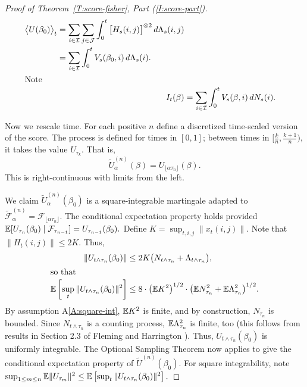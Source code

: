 \documentclass[aoas,preprint]{imsart}
\begin{document}
\begin{proof}[Proof of Theorem~\ref{T:score-fisher}, Part \textit{(\ref{I:score-part})}]
\begin{align}
\begin{split}\label{E:score-compensator}
    \big\langle U(\beta_0) \big\rangle_t
        &=
            \sum_{i \in \mathcal{I}}
            \sum_{j \in \mathcal{J}}
            \int_0^t
                \big[ H_s(i,j) \big]^{\otimes 2} \,
                d\Lambda_s(i,j) \\
        &=
            \sum_{i \in \mathcal{I}}
            \int_0^t
                V_s(\beta_0, i) \,
                d\Lambda_s(i).
\end{split} \\
\intertext{Note}\label{E:var-estimate}
    I_t(\beta)
        &=
            \sum_{i \in \mathcal{I}}
            \int_0^t
                V_s(\beta, i) \,
                dN_s(i).
\end{align}

Now we rescale time.
For each positive $n$ define a discretized time-scaled version of the score.  
The process is defined for times in $[0,1]$; between times in
$[\tfrac{k}{n}, \tfrac{k+1}{n})$, it takes the value $U_{\tau_k}$.  That is,
\[
    \tilde U_{\alpha}^{(n)}(\beta)
        = U_{\lfloor \alpha \tau_n \rfloor}(\beta).
\]
This is right-continuous with limits from the left.

We claim $\tilde U_\alpha^{(n)}(\beta_0)$ is a square-integrable martingale
adapted to
\(
    \mathcal{\tilde F}^{(n)}_\alpha
        =
        \mathcal{F}_{\lfloor \alpha \tau_n \rfloor}.
\)
The conditional expectation property holds provided
\(
    \mathbb{E}[ U_{\tau_{n}}(\beta_0) \mid \mathcal{F}_{\tau_{n-1}} ]
        = U_{\tau_{n-1}}(\beta_0).
\)
Define $K = \sup_{t,i,j} \| x_{t}(i,j) \|$.
Note that $\|H_{t}(i,j)\| \leq 2 K$.  Thus,
\begin{align*}
    \| U_{t \wedge \tau_n} (\beta_0) \|
        &\leq
            2 K
            \big(
                N_{t \wedge \tau_n}
                +
                \Lambda_{t \wedge \tau_n}
            \big), \\
\intertext{so that}
    \E \left[
        \sup_t
        \| U_{t \wedge \tau_n} (\beta_0) \|^2
    \right]
        &\leq
            8 \cdot \big(\E K^2\big)^{1/2} \cdot
            \big(
              \E N_{\tau_n}^2
              +
              \E \Lambda_{\tau_n}^2              
            \big)^{1/2}.
\end{align*}
By assumption A\ref{A:square-int}, $\mathbb{E} K^2$ is finite, and by construction,
$N_{\tau_n}$ is bounded.  Since $N_{t \wedge \tau_n}$ is a counting process,
$\mathbb{E} \Lambda_{\tau_n}^2$ is finite, too
(this follows from results in Section 2.3 of Fleming and Harrington
\cite{fleming1991counting}).  Thus, $U_{t \wedge \tau_n}(\beta_0)$
is uniformly integrable.  The Optional Sampling Theorem now applies to
give the conditional expectation property of $\tilde U^{(n)}(\beta_0)$.  For
square integrability, note
\(
    \sup_{1 \leq m \leq n}
    \mathbb{E} \| U_{\tau_m} \|^2
        \leq
        \mathbb{E} \left[
           \sup_t
           \| U_{t \wedge \tau_n} (\beta_0) \|^2
        \right].
\)


\end{proof}
\end{document}
